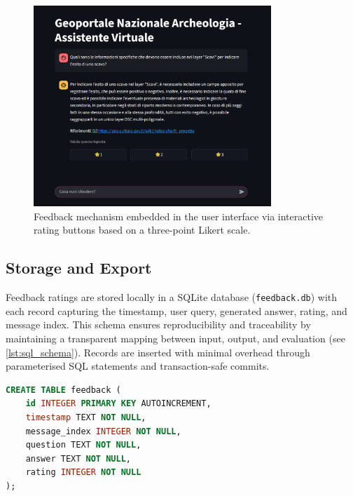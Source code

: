 \begin{spacing}{1.5}
\begin{figure}[H]
  \centering
  \includegraphics[width=0.8\textwidth]{images/ui_ratings.png} 
  \caption{Feedback mechanism embedded in the user interface via interactive rating buttons based on a three-point Likert scale.}
  \label{fig:ratings}
\end{figure}

\subsection{Storage and Export}
Feedback ratings are stored locally in a SQLite \citep{team_sqlitesqlite_2025} database (\texttt{feedback.db}) with each record capturing the timestamp, user query, generated answer, rating, and message index. This schema ensures reproducibility and traceability by maintaining a transparent mapping between input, output, and evaluation (see \autoref{lst:sql_schema}). Records are inserted with minimal overhead through parameterised SQL statements and transaction-safe commits.

\vspace{0.5em}
\begin{lstlisting}[language=SQL,
                  frame=none,
                   caption={SQL schema of the feedback database.},
                   captionpos=b,
                   label={lst:sql_schema},
  xleftmargin=0.2\textwidth,
  xrightmargin=0.1\textwidth]
CREATE TABLE feedback (
    id INTEGER PRIMARY KEY AUTOINCREMENT,
    timestamp TEXT NOT NULL,
    message_index INTEGER NOT NULL,
    question TEXT NOT NULL,
    answer TEXT NOT NULL,
    rating INTEGER NOT NULL
);
\end{lstlisting}


\end{spacing}
